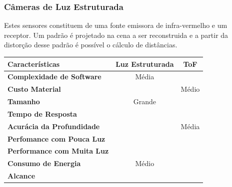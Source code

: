 \subsubsection{Câmeras de Luz Estruturada}

Estes sensores constituem de uma fonte emissora de infra-vermelho e um receptor.
Um padrão é projetado na cena a ser reconstruida e a partir da distorção desse
padrão é possível o cálculo de distâncias. 



\begin{center}
\begin{tabular}{lcc}
\hline
{\bf Características}           & {\bf Luz Estruturada}                                      & {\bf ToF}                                                  \\ \hline
{\bf Complexidade de Software}  & Média                                                      & \cellcolor[HTML]{92D050}{\color[HTML]{000000} {\bf Baixa}} \\
{\bf Custo Material}            & \cellcolor[HTML]{FE0000}{\color[HTML]{FFFFFF} {\bf Alto}}  & Médio                                                      \\
{\bf Tamanho}                   & Grande                                                     & \cellcolor[HTML]{92D050}{\bf Pequeno}                      \\
{\bf Tempo de Resposta}         & \cellcolor[HTML]{FE0000}{\color[HTML]{FFFFFF} {\bf Alto}}  & \cellcolor[HTML]{92D050}{\bf Baixo}                        \\
{\bf Acurácia da Profundidade}  & \cellcolor[HTML]{92D050}{\bf Alta}                         & Média                                                      \\
{\bf Perfomance com Pouca Luz}  & \cellcolor[HTML]{92D050}{\bf Boa}                          & \cellcolor[HTML]{92D050}{\bf Boa}                          \\
{\bf Performance com Muita Luz} & \cellcolor[HTML]{FE0000}{\color[HTML]{FFFFFF} {\bf Fraca}} & \cellcolor[HTML]{92D050}{\bf Boa}                          \\
{\bf Consumo de Energia}        & Médio                                                      & \cellcolor[HTML]{92CDDC}{\bf Escalavel}                    \\
{\bf Alcance}                   & \cellcolor[HTML]{92CDDC}{\bf Escalavel}                    & \cellcolor[HTML]{92CDDC}{\bf Escalavel}                    \\ \hline
\end{tabular}
\label{tab::estructvstof}
\end{center}


